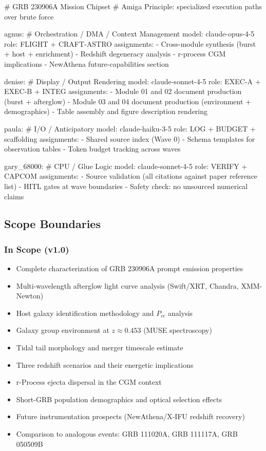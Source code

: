 \documentclass[11pt,letterpaper]{article}
\begin{document}
\begin{asciibox}
# GRB 230906A Mission Chipset
# Amiga Principle: specialized execution paths over brute force

agnus:          # Orchestration / DMA / Context Management
  model:        claude-opus-4-5
  role:         FLIGHT + CRAFT-ASTRO
  assignments:
    - Cross-module synthesis (burst + host + enrichment)
    - Redshift degeneracy analysis
    - r-process CGM implications
    - NewAthena future-capabilities section

denise:         # Display / Output Rendering
  model:        claude-sonnet-4-5
  role:         EXEC-A + EXEC-B + INTEG
  assignments:
    - Module 01 and 02 document production (burst + afterglow)
    - Module 03 and 04 document production (environment + demographics)
    - Table assembly and figure description rendering

paula:          # I/O / Anticipatory
  model:        claude-haiku-3-5
  role:         LOG + BUDGET + scaffolding
  assignments:
    - Shared source index (Wave 0)
    - Schema templates for observation tables
    - Token budget tracking across waves

gary_68000:     # CPU / Glue Logic
  model:        claude-sonnet-4-5
  role:         VERIFY + CAPCOM
  assignments:
    - Source validation (all citations against paper reference list)
    - HITL gates at wave boundaries
    - Safety check: no unsourced numerical claims
\end{asciibox}

\subsection{Scope Boundaries}

\subsubsection{In Scope (v1.0)}
\begin{itemize}[leftmargin=*]
  \item Complete characterization of GRB 230906A prompt emission properties
  \item Multi-wavelength afterglow light curve analysis (Swift/XRT, Chandra, XMM-Newton)
  \item Host galaxy identification methodology and $P_{cc}$ analysis
  \item Galaxy group environment at $z \approx 0.453$ (MUSE spectroscopy)
  \item Tidal tail morphology and merger timescale estimate
  \item Three redshift scenarios and their energetic implications
  \item r-Process ejecta dispersal in the CGM context
  \item Short-GRB population demographics and optical selection effects
  \item Future instrumentation prospects (NewAthena/X-IFU redshift recovery)
  \item Comparison to analogous events: GRB 111020A, GRB 111117A, GRB 050509B
\end{itemize}
\end{document}
